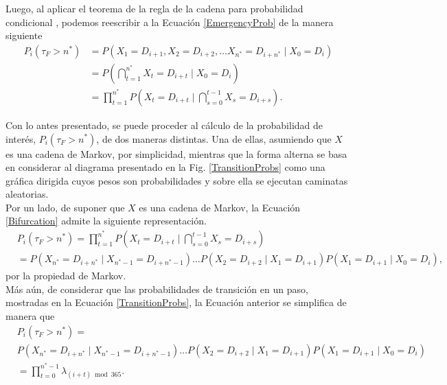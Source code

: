 %

Luego, al aplicar el teorema de la regla de la cadena para probabilidad condicional \cite[Capítulo 3]{Ross_2020}, podemos reescribir a la Ecuación \eqref{EmergencyProb} de la manera siguiente \begin{equation}
	\begin{aligned}
		P_{i}(\tau_F>n^*)
		&=P( X_1 = D_{i+1}, X_2 =D_{i+2}, \ldots X_{n^*} =D_{i+n^*} \mid X_{0}=D_i )\\
		&=P\left(\bigcap_{t=1}^{n^*} {X_{t}= D_{i+t}}\mid X_{0}=D_i \right)\\
		&=\prod_{t=1}^{n^*} P\left( X_{t}= D_{i+t}\mid \bigcap_{s=0}^{t-1} X_{s}=D_{i+s} \right).
	\end{aligned}
	\label{Bifurcation}
\end{equation}



Con lo antes presentado, se puede proceder al cálculo de la probabilidad de interés, $P_{i}(\tau_F>n^*)$, de dos maneras distintas. Una de ellas, asumiendo que $X$ es una cadena de Markov, por simplicidad, mientras que la forma alterna se basa en considerar al diagrama presentado en la Fig. \ref{TransitionProbs} como una gráfica dirigida cuyos pesos son probabilidades y sobre ella se ejecutan caminatas aleatorias.\\



Por un lado, de suponer que $X$ es una cadena de Markov, la Ecuación \eqref{Bifurcation} admite la siguiente representación. \begin{equation}
	\begin{aligned}
			&P_{i}(\tau_F>n^*)
			=\prod_{t=1}^{n^*} P\left( X_{t}= D_{i+t}\mid \bigcap_{s=0}^{t-1} X_{s}=D_{i+s} \right)\\
			&=P(X_{n^*}=D_{i+n^*} \mid X_{n^*-1}=D_{i+n^*-1})\ldots P(X_{2}=D_{i+2}\mid X_{1}=D_{i+1}) P(X_{1}=D_{i+1} \mid X_0 = D_{i}),
	\end{aligned}
\end{equation}por la propiedad de Markov.\\


Más aún, de considerar que las probabilidades de transición en un paso, mostradas en la Ecuación \eqref{TransitionProbs}, la Ecuación anterior se simplifica de manera que \begin{equation}
	\begin{aligned}
		&P_{i}(\tau_F>n^*)=\\
		&P(X_{n^*}=D_{i+n^*} \mid X_{n^*-1}=D_{i+n^*-1})\ldots P(X_{2}=D_{i+2}\mid X_{1}=D_{i+1}) P(X_{1}=D_{i+1} \mid X_0 = D_{i})\\
		&=\prod_{t=0}^{n^*-1} \lambda_{(i+t) \bmod{365}}.
	\end{aligned}
	\label{product_lambdas}
\end{equation}



